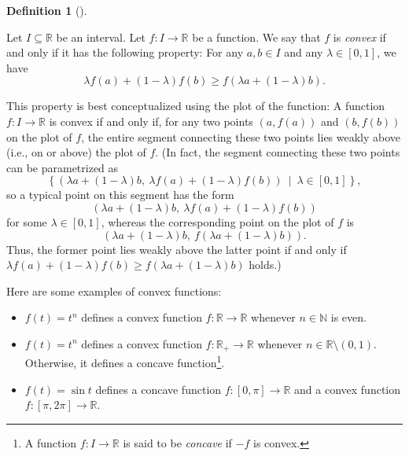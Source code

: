 \documentclass[numbers=enddot,12pt,final,onecolumn,notitlepage]{scrartcl}%
\numberwithin{exer}{subsection}
\theoremstyle{definition}
\newtheorem{defi}[theo]{Definition}
\newenvironment{definition}[1][]
{\begin{defi}[#1]\begin{leftbar}}
{\end{leftbar}\end{defi}}
\begin{document}
\begin{definition}
\label{def.major.convex}Let $I\subseteq\mathbb{R}$ be an interval. Let
$f:I\rightarrow\mathbb{R}$ be a function. We say that $f$ is \emph{convex} if
and only if it has the following property: For any $a,b\in I$ and any
$\lambda\in\left[  0,1\right]  $, we have%
\[
\lambda f\left(  a\right)  +\left(  1-\lambda\right)  f\left(  b\right)  \geq
f\left(  \lambda a+\left(  1-\lambda\right)  b\right)  .
\]

\end{definition}

This property is best conceptualized using the plot of the function: A
function $f:I\rightarrow\mathbb{R}$ is convex if and only if, for any two
points $\left(  a,f\left(  a\right)  \right)  $ and $\left(  b,f\left(
b\right)  \right)  $ on the plot of $f$, the entire segment connecting these
two points lies weakly above (i.e., on or above) the plot of $f$. (In fact,
the segment connecting these two points can be parametrized as
\[
\left\{  \left(  \lambda a+\left(  1-\lambda\right)  b,\ \lambda f\left(
a\right)  +\left(  1-\lambda\right)  f\left(  b\right)  \right)
\ \mid\ \lambda\in\left[  0,1\right]  \right\}  ,
\]
so a typical point on this segment has the form
\[
\left(  \lambda a+\left(  1-\lambda\right)  b,\ \lambda f\left(  a\right)
+\left(  1-\lambda\right)  f\left(  b\right)  \right)
\]
for some $\lambda\in\left[  0,1\right]  $, whereas the corresponding point on
the plot of $f$ is
\[
\left(  \lambda a+\left(  1-\lambda\right)  b,\ f\left(  \lambda a+\left(
1-\lambda\right)  b\right)  \right)  .
\]
Thus, the former point lies weakly above the latter point if and only if
$\lambda f\left(  a\right)  +\left(  1-\lambda\right)  f\left(  b\right)  \geq
f\left(  \lambda a+\left(  1-\lambda\right)  b\right)  $ holds.)

Here are some examples of convex functions:

\begin{itemize}
\item $f\left(  t\right)  =t^{n}$ defines a convex function $f:\mathbb{R}%
\rightarrow\mathbb{R}$ whenever $n\in\mathbb{N}$ is even.

\item $f\left(  t\right)  =t^{n}$ defines a convex function $f:\mathbb{R}%
_{+}\rightarrow\mathbb{R}$ whenever $n\in\mathbb{R}\setminus\left(
0,1\right)  $. Otherwise, it defines a concave function\footnote{A function
$f:I\rightarrow\mathbb{R}$ is said to be \emph{concave} if $-f$ is convex.}.

\item $f\left(  t\right)  =\sin t$ defines a concave function $f:\left[
0,\pi\right]  \rightarrow\mathbb{R}$ and a convex function $f:\left[  \pi
,2\pi\right]  \rightarrow\mathbb{R}$.
\end{itemize}
\end{document}
